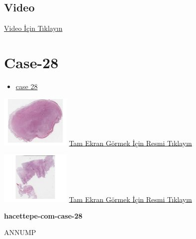 \documentclass[
  letterpaper,
  DIV=11,
  numbers=noendperiod]{scrreprt}
\providecommand{\tightlist}{%
  \setlength{\itemsep}{0pt}\setlength{\parskip}{0pt}}\usepackage{longtable,booktabs,array}
\begin{document}
\hypertarget{video-25}{%
\subsection{Video}\label{video-25}}

\href{https://www.youtube.com/watch?v=c2ePAdTH00g}{Video İçin Tıklayın}

\hypertarget{sec-hacettepe-case-of-the-month-case-28}{%
\section{Case-28}\label{sec-hacettepe-case-of-the-month-case-28}}

\begin{itemize}
\tightlist
\item
  \href{https://www.youtube.com/watch?v=yUrabUzw3RI\&ab_channel=KemalKosemehmetoglu}{case
  28}
\end{itemize}

\href{https://images.patolojiatlasi.com/hacettepe-com-case-28/HE1.html}{\includegraphics[width=0.25\textwidth,height=\textheight]{./screenshots/hacettepe-com-case-28-1_screenshot.png}}
\href{https://images.patolojiatlasi.com/hacettepe-com-case-28/HE1.html}{Tam
Ekran Görmek İçin Resmi Tıklayın}

\href{https://images.patolojiatlasi.com/hacettepe-com-case-28/HE2.html}{\includegraphics[width=0.25\textwidth,height=\textheight]{./screenshots/hacettepe-com-case-28-2_screenshot.png}}
\href{https://images.patolojiatlasi.com/hacettepe-com-case-28/HE2.html}{Tam
Ekran Görmek İçin Resmi Tıklayın}

\textbf{hacettepe-com-case-28}

\begin{tcolorbox}[enhanced jigsaw, left=2mm, toprule=.15mm, rightrule=.15mm, bottomrule=.15mm, leftrule=.75mm, colback=white, colframe=quarto-callout-tip-color-frame, toptitle=1mm, breakable, titlerule=0mm, colbacktitle=quarto-callout-tip-color!10!white, bottomtitle=1mm, title=\textcolor{quarto-callout-tip-color}{\faLightbulb}\hspace{0.5em}{Tanı}, arc=.35mm, opacitybacktitle=0.6, opacityback=0, coltitle=black]

ANNUMP

\end{tcolorbox}
\end{document}
